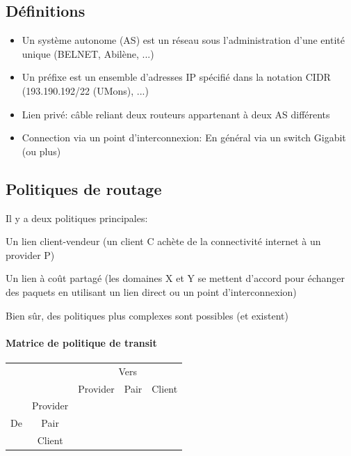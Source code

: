 \documentclass{report}
\begin{document}
\subsection{Définitions}

\begin{itemize}
\item Un système autonome (AS) est un réseau sous l'administration
  d'une entité unique (BELNET, Abilène, ...)
\item Un préfixe est un ensemble d'adresses IP spécifié dans la
  notation CIDR (193.190.192/22 (UMons), ...)
\item Lien privé: câble reliant deux routeurs appartenant à deux AS
  différents
\item Connection via un point d'interconnexion: En général via un
  switch Gigabit (ou plus)
\end{itemize}

\subsection{Politiques de routage}

Il y a deux politiques principales:

Un lien client-vendeur (un client C achète de la connectivité internet
à un provider P)

Un lien à coût partagé (les domaines X et Y se mettent d'accord pour
échanger des paquets en utilisant un lien direct ou un point
d'interconnexion)

Bien sûr, des politiques plus complexes sont possibles (et existent)

\paragraph{Matrice de politique de transit}

\begin{tabular}{c|c|c|c|c|}
  \multicolumn{2}{c|}{} & \multicolumn{3}{c|}{Vers} \\
  \cline{3-5}
  \multicolumn{2}{c|}{} & Provider & Pair & Client \\
  \hline
  \multirow{3}{*}{De} & Provider & \color{red}{Non} & \color{red}{Non} &
     \color{green}{Oui} \\
  \cline{2-5}
  & Pair & \color{red}{Non} & \color{red}{Non} & \color{green}{Oui} \\
  \cline{2-5}
  & Client & \color{green}{Oui} & \color{green}{Oui} & \color{green}{Oui} \\
  \hline
\end{tabular}
\end{document}
